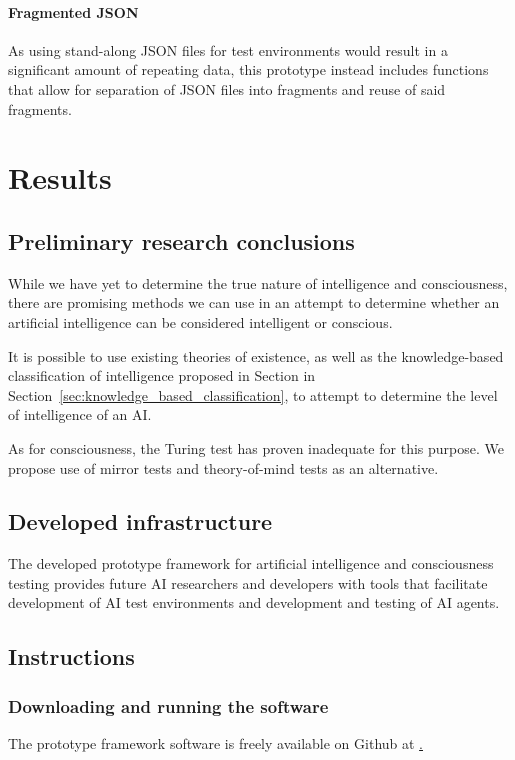 \documentclass[masterthesis]{fer}
\begin{document}
\subsubsection{Fragmented JSON}
As using stand-along JSON files for test environments would result in a significant amount of repeating data,
this prototype instead includes functions that allow for separation of JSON files into fragments and reuse of said fragments.
\chapter{Results}
\label{sec:results}
\section{Preliminary research conclusions}
While we have yet to determine the true nature of intelligence and consciousness, there are promising methods we can use in an attempt to determine whether an artificial intelligence can be considered intelligent or conscious.

It is possible to use existing theories of existence, as well as the knowledge-based classification of intelligence proposed in Section in Section~\ref{sec:knowledge_based_classification}, to attempt to determine the level of intelligence of an AI. 

As for consciousness, the Turing test has proven inadequate for this purpose. We propose use of mirror tests and theory-of-mind tests as an alternative.
\section{Developed infrastructure}
The developed prototype framework for artificial intelligence and consciousness testing provides future AI researchers and developers with tools that facilitate development of AI test environments and development and testing of AI agents. 
\section{Instructions}
\subsection{Downloading and running the software}
The prototype framework software is freely available on Github at
\href{https://github.com/Dorijan-Cirkveni/diplomski-rad} .
\end{document}
